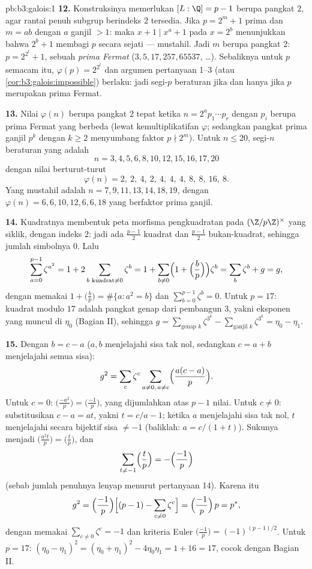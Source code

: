 \begin{solution}{pb:b3:galois:1}
\textbf{12.} Konstruksinya memerlukan $[L:\Q] = p - 1$ berupa
pangkat $2$, agar rantai penuh subgrup berindeks $2$
tersedia. Jika $p = 2^m + 1$ prima dan $m = ab$ dengan $a$ ganjil $>
1$: maka $x + 1 \mid x^a + 1$ pada $x = 2^b$ menunjukkan bahwa $2^b + 1$ membagi
$p$ secara sejati --- mustahil. Jadi $m$ berupa pangkat $2$: $p =
2^{2^t} + 1$, sebuah \emph{prima Fermat} ($3, 5, 17, 257, 65537$,
\dots). Sebaliknya untuk $p$ semacam itu, $\varphi(p) = 2^{2^t}$ dan
argumen pertanyaan 1--3 (atau
\cref{cor:b3:galois:impossible}) berlaku: jadi segi-$p$ beraturan
 jika dan hanya jika $p$ merupakan prima Fermat.

\textbf{13.} Nilai $\varphi(n)$ berupa pangkat $2$ tepat ketika $n =
2^a p_1\cdots p_r$ dengan $p_i$ berupa prima Fermat yang berbeda
(lewat kemultiplikatifan $\varphi$; sedangkan pangkat prima ganjil $p^k$ dengan $k
\geq 2$ menyumbang faktor $p \nmid 2^m$). Untuk $n \leq
20$, segi-$n$ beraturan yang  adalah
\[
n = 3, 4, 5, 6, 8, 10, 12, 15, 16, 17, 20
\]
dengan nilai berturut-turut
\[
\varphi(n) = 2,\ 2,\ 4,\ 2,\ 4,\ 4,\ 4,\ 8,\ 8,\ 16,\ 8 .
\]
Yang mustahil adalah $n = 7, 9, 11, 13, 14, 18, 19$, dengan
$\varphi(n) = 6, 6, 10, 12, 6, 6, 18$ yang berfaktor prima ganjil.

\textbf{14.} Kuadratnya membentuk peta morfisma pengkuadratan
pada $(\Z/p\Z)^\times$ yang siklik, dengan indeks $2$:
jadi ada $\frac{p-1}2$ kuadrat dan $\frac{p-1}2$ bukan-kuadrat, sehingga
jumlah simbolnya $0$. Lalu
\[
\sum_{a=0}^{p-1}\zeta^{a^2} = 1 + 2\sum_{b \text{ kuadrat}
\neq 0}\zeta^b
= 1 + \sum_{b\neq0}\Bigl(1 + \Bigl(\frac bp\Bigr)\Bigr)
\zeta^b = \sum_{b}\zeta^b + g = g,
\]
dengan memakai $1 + \bigl(\frac bp\bigr) = \#\{a : a^2 = b\}$ dan
$\sum_{b=0}^{p-1}\zeta^b = 0$. Untuk $p = 17$: kuadrat modulo
$17$ adalah pangkat genap dari pembangun $3$, yakni
eksponen yang muncul di $\eta_0$ (Bagian II), sehingga $g =
\sum_{\text{genap }k}\zeta^{3^k} - \sum_{\text{ganjil }k}
\zeta^{3^k} = \eta_0 - \eta_1$.

\textbf{15.} Dengan $b = c - a$ ($a, b$ menjelajahi sisa tak nol,
sedangkan $c = a + b$ menjelajahi semua sisa):
\[
g^2 = \sum_c\zeta^c\sum_{a\neq0,\,a\neq c}
\Bigl(\frac{a(c-a)}p\Bigr) .
\]
Untuk $c = 0$: $\bigl(\frac{-a^2}p\bigr) =
\bigl(\frac{-1}p\bigr)$, yang dijumlahkan atas $p - 1$ nilai. Untuk $c \neq 0$: substitusikan $c - a = at$, yakni $t = c/a -
1$; ketika $a$ menjelajahi sisa tak nol, $t$ menjelajahi
secara bijektif sisa $\neq -1$ (baliklah: $a = c/(1 +
t)$). Sukunya menjadi $\bigl(\frac{a^2t}p\bigr) =
\bigl(\frac tp\bigr)$, dan
\[
\sum_{t \neq -1}\Bigl(\frac tp\Bigr)
= -\Bigl(\frac{-1}p\Bigr)
\]
(sebab jumlah penuhnya lenyap menurut pertanyaan 14). Karena itu
\[
g^2 = \Bigl(\frac{-1}p\Bigr)\Bigl[(p-1) -
\sum_{c\neq0}\zeta^c\Bigr]
= \Bigl(\frac{-1}p\Bigr)\,p = p^* ,
\]
dengan memakai $\sum_{c\neq0}\zeta^c = -1$ dan kriteria Euler
$\bigl(\frac{-1}p\bigr) = (-1)^{(p-1)/2}$. Untuk $p = 17$:
$(\eta_0 - \eta_1)^2 = (\eta_0 + \eta_1)^2 - 4\eta_0\eta_1 =
1 + 16 = 17$, cocok dengan Bagian II.


\end{solution}
